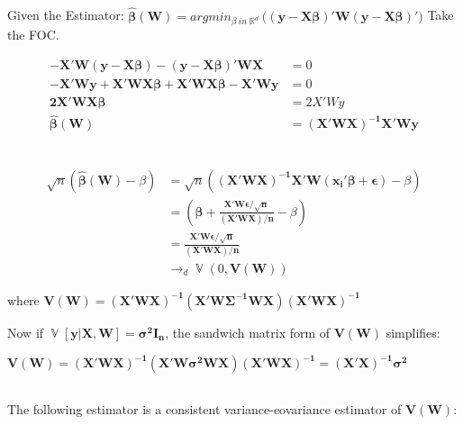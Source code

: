 \documentclass[12pt]{article}
\begin{document}
\subsection{}

Given the Estimator:
$\mathbf{\hat{\beta}(W)} = argmin_{\beta \ in \mathop{\mathbb{R}}^d} (\mathbf{(y-X\beta)'W(y-X\beta)')}$ Take the FOC.

\begin{equation}
\begin{split}
\mathbf{-X'W(y-X\beta)-(y-X\beta)'WX} & = 0 \\
\mathbf{-X'Wy + X'WX\beta + X'WX\beta - X'Wy} & = 0 \\
\mathbf{ 2X'WX\beta}  & = 2X'Wy  \\
\mathbf{\hat{\beta}(W)} & = \mathbf{(X'WX)^{-1} X'Wy} \\
\end{split}
\end{equation}

\subsection{}

\begin{equation}
\begin{split}
\sqrt{n}\left(\mathbf{\hat{\beta}(W)} - \beta \right) & = \sqrt{n}\left( \mathbf{(X'WX)^{-1} X'W(x_i'\beta + \epsilon)} - \beta \right) \\
& = \left( \mathbf{\beta + \frac{X'W\epsilon/\sqrt{n}}{(X'WX)/n}} - \beta \right)  \\
& = \mathbf{\frac{X'W\epsilon/\sqrt{n}}{(X'WX)/n}} \\
&\rightarrow_d \mathop{\mathbb{V}}(0,\mathbf{V(W)})\
\end{split}
\end{equation}


\hspace{3cm} where $\mathbf{V(W) = (X'WX)^{-1}(X'W\Sigma^{-1}WX)(X'WX)^{-1}}$

Now if $\mathop{\mathbb{V}}\mathbf{[y|X,W] = \sigma^2I_n}$, the sandwich matrix form of $\mathbf{V(W)}$ simplifies:

$\mathbf{V(W) = (X'WX)^{-1}(X'W\sigma^2WX)(X'WX)^{-1} = (X'X)^{-1}\sigma^2 } $

\subsection{}

The following estimator is a consistent variance-covariance estimator of $\mathbf{V(W)}$:
\end{document}
